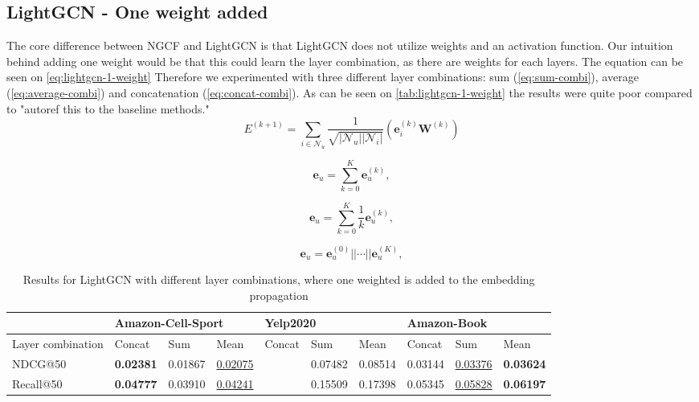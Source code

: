 \subsection{LightGCN - One weight added}
The core difference between NGCF and LightGCN is that LightGCN does not utilize weights and an activation function.
Our intuition behind adding one weight would be that this could learn the layer combination, as there are weights for each layers.
The equation can be seen on \autoref{eq:lightgcn-1-weight}
Therefore we experimented with three different layer combinations: sum (\autoref{eq:sum-combi}), average (\autoref{eq:average-combi}) and concatenation (\autoref{eq:concat-combi}).
As can be seen on \autoref{tab:lightgcn-1-weight} the results were quite poor compared to "autoref this to the baseline methods."
\begin{equation}
    E^{(k+1)} = \sum_{i \in \mathcal{N}_u} \frac{1}{\sqrt{|\mathcal{N}_u||\mathcal{N}_i|}}\left( \mathbf{e}_i^{(k)} \mathbf{W}^{(k)} \right)
    \label{eq:lightgcn-1-weight}
\end{equation}

\begin{equation}
    \mathbf{e}_u = \sum_{k=0}^{K} \mathbf{e}_u^{(k)},
    \label{eq:sum-combi}
\end{equation}

\begin{equation}
    \mathbf{e}_u = \sum_{k=0}^{K} \frac{1}{k} \mathbf{e}_u^{(k)},
    \label{eq:average-combi}
\end{equation}

\begin{equation}
    \mathbf{e}_u = \mathbf{e}_u^{(0)}|| \cdots || \mathbf{e}_u^{(K)},
    \label{eq:concat-combi}
\end{equation}

\begin{table*}[]
    \begin{tabular}{|l|l|l|l|l|l|l|l|l|l|}
        \hline
                          & \multicolumn{3}{l|}{Amazon-Cell-Sport} & \multicolumn{3}{l|}{Yelp2020} & \multicolumn{3}{l|}{Amazon-Book}                                                                          \\ \hline
        Layer combination & Concat                                 & Sum                           & Mean                             & Concat & Sum        & Mean        & Concat  & Sum                 & Mean             \\ \hline
        NDCG@50           & \textbf{0.02381}                       & 0.01867                       & \underline{0.02075}              &        & 0.07482    & 0.08514     & 0.03144 & \underline{0.03376} & \textbf{0.03624} \\ \hline
        Recall@50         & \textbf{0.04777}                       & 0.03910                       & \underline{0.04241}              &        & 0.15509    & 0.17398     & 0.05345 & \underline{0.05828} & \textbf{0.06197} \\ \hline
    \end{tabular}
    \caption{Results for LightGCN with different layer combinations, where one weighted is added to the embedding propagation}
    \label{tab:lightgcn-1-weight}
\end{table*}
